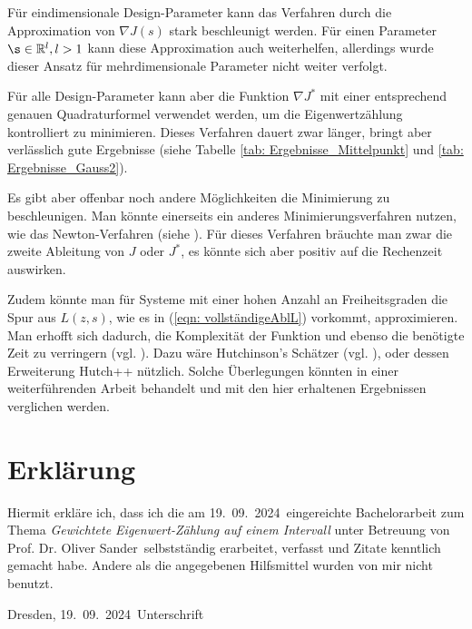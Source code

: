 \documentclass[a4paper,12pt]{report}
\newcommand{\betreuer}{Prof. Dr. Oliver Sander}
\newcommand{\thema}{Gewichtete Eigenwert-Zählung auf einem Intervall}
\newcommand{\datum}{19.\ 09.\ 2024} %
\newcommand{\R}{\mathbb R}
\newcommand{\zitat}[1]{\glqq #1\grqq}
\newcommand{\1}{\mathds{1}}
\theoremstyle{plain} %
\theoremstyle{definition} %
\theoremstyle{remark}
\begin{document}
      Für eindimensionale Design-Parameter kann das Verfahren durch die Approximation von $\nabla J(s)$ stark beschleunigt werden.
      Für einen Parameter $\s\in \R^l, l>1$ kann diese Approximation auch weiterhelfen, allerdings wurde dieser Ansatz für mehrdimensionale Parameter nicht weiter verfolgt.

      Für alle Design-Parameter kann aber die Funktion $\nabla J^*$ mit einer entsprechend genauen Quadraturformel verwendet werden, um die Eigenwertzählung kontrolliert zu minimieren.
      Dieses Verfahren dauert zwar länger, bringt aber verlässlich gute Ergebnisse (siehe Tabelle \ref{tab: Ergebnisse_Mittelpunkt} und \ref{tab: Ergebnisse_Gauss2}).

      Es gibt aber offenbar noch andere Möglichkeiten die Minimierung zu beschleunigen.
      Man könnte einerseits ein anderes Minimierungsverfahren nutzen, wie das Newton-Verfahren (siehe \cite[S. 290]{optimierungBurkhard}).
      Für dieses Verfahren bräuchte man zwar die zweite Ableitung von $J$ oder $J^*$, es könnte sich aber positiv auf die Rechenzeit auswirken.

      Zudem könnte man für Systeme mit einer hohen Anzahl an Freiheitsgraden die Spur aus $L(z,s)$, wie es in (\ref{eqn: vollständigeAblL}) vorkommt, approximieren.
      Man erhofft sich dadurch, die Komplexität der Funktion und ebenso die benötigte Zeit zu verringern (vgl. \cite[S. 128]{grundlageFutamura}).
      Dazu wäre Hutchinson's Schätzer (vgl. \cite[S. 142]{hutch++Meyer}), oder dessen Erweiterung \zitat{Hutch++}\cite[S. 142]{hutch++Meyer} nützlich.
      Solche Überlegungen könnten in einer weiterführenden Arbeit behandelt und mit den hier erhaltenen Ergebnissen verglichen werden.

\printbibliography

\listoffigures
\chapter*{Erkl\"{a}rung}
\thispagestyle{empty}
Hiermit erkl\"{a}re ich, dass ich die am \datum\ eingereichte Bachelorarbeit zum Thema
\emph{\thema} unter Betreuung von \betreuer\ selbstst\"{a}ndig erarbeitet,
verfasst und Zitate kenntlich gemacht habe. Andere als die angegebenen Hilfsmittel
wurden von mir nicht benutzt.

\bigskip \bigskip \bigskip \bigskip \bigskip

Dresden, \datum\ \hfill Unterschrift

\normalsize
\end{document}
